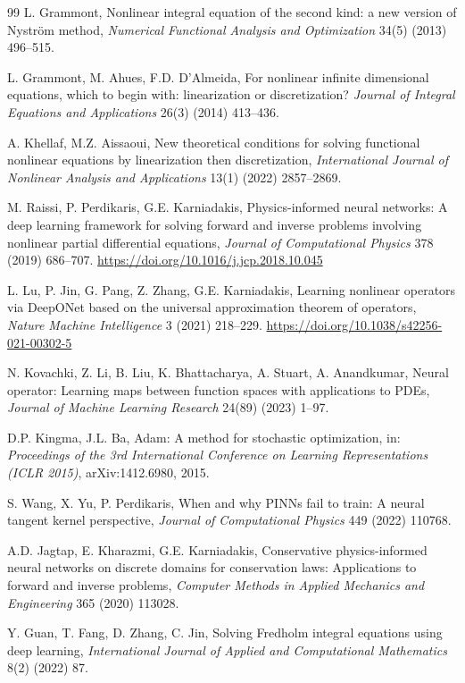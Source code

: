 \documentclass[12pt, a4paper]{article}
\begin{document}
\begin{thebibliography}{99}
L. Grammont,
Nonlinear integral equation of the second kind:
a new version of Nystr\"{o}m method,
\textit{Numerical Functional Analysis and Optimization}
34(5) (2013) 496--515.

L. Grammont, M. Ahues, F.D. D'Almeida,
For nonlinear infinite dimensional equations, which to
begin with: linearization or discretization?
\textit{Journal of Integral Equations and Applications}
26(3) (2014) 413--436.

A. Khellaf, M.Z. Aissaoui,
New theoretical conditions for solving functional
nonlinear equations by linearization then discretization,
\textit{International Journal of Nonlinear Analysis and
Applications} 13(1) (2022) 2857--2869.

M. Raissi, P. Perdikaris, G.E. Karniadakis,
Physics-informed neural networks: A deep learning
framework for solving forward and inverse problems
involving nonlinear partial differential equations,
\textit{Journal of Computational Physics} 378 (2019)
686--707.
\url{https://doi.org/10.1016/j.jcp.2018.10.045}

L. Lu, P. Jin, G. Pang, Z. Zhang, G.E. Karniadakis,
Learning nonlinear operators via DeepONet based on the
universal approximation theorem of operators,
\textit{Nature Machine Intelligence} 3 (2021) 218--229.
\url{https://doi.org/10.1038/s42256-021-00302-5}

N. Kovachki, Z. Li, B. Liu, K. Bhattacharya,
A. Stuart, A. Anandkumar,
Neural operator: Learning maps between function spaces
with applications to PDEs,
\textit{Journal of Machine Learning Research}
24(89) (2023) 1--97.

D.P. Kingma, J.L. Ba,
Adam: A method for stochastic optimization,
in: \textit{Proceedings of the 3rd International
Conference on Learning Representations (ICLR 2015)},
arXiv:1412.6980, 2015.

S. Wang, X. Yu, P. Perdikaris,
When and why PINNs fail to train: A neural tangent
kernel perspective,
\textit{Journal of Computational Physics} 449 (2022)
110768.

A.D. Jagtap, E. Kharazmi, G.E. Karniadakis,
Conservative physics-informed neural networks on discrete
domains for conservation laws: Applications to forward
and inverse problems,
\textit{Computer Methods in Applied Mechanics and
Engineering} 365 (2020) 113028.

Y. Guan, T. Fang, D. Zhang, C. Jin,
Solving Fredholm integral equations using deep learning,
\textit{International Journal of Applied and Computational
Mathematics} 8(2) (2022) 87.


\end{thebibliography}
\end{document}
